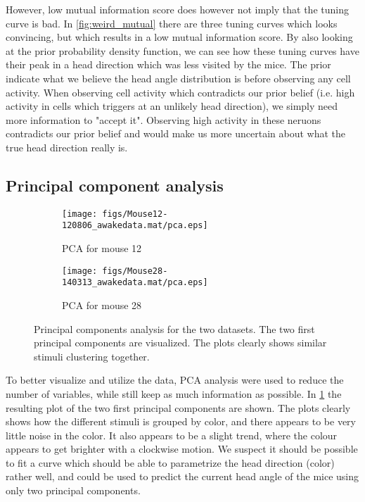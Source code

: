 However, low mutual information score does however not imply that the tuning curve is bad. In \cref{fig:weird_mutual} there are three tuning curves which looks convincing, but which results in a low mutual information score. By also looking at the prior probability density function, we can see how these tuning curves have their peak in a head direction which was less visited by the mice. The prior indicate what we believe the head angle distribution is before observing any cell activity. When observing cell activity which contradicts our prior belief (i.e. high activity in cells which triggers at an unlikely head direction), we simply need more information to "accept it". Observing high activity in these neruons contradicts our prior belief and would make us more uncertain about what the true head direction really is. 

\subsection{Principal component analysis}
\begin{figure}[H]
    \centering
    \begin{subfigure}[b]{0.4\textwidth}
        \texttt{[image: figs/Mouse12-120806\_awakedata.mat/pca.eps]}
        \caption{PCA for mouse 12}
    \end{subfigure}
    \begin{subfigure}[b]{0.4\textwidth}
        \texttt{[image: figs/Mouse28-140313\_awakedata.mat/pca.eps]}
        \caption{PCA for mouse 28}

    \end{subfigure}
    \caption{Principal components analysis for the two datasets. The two first principal components are visualized. The plots clearly shows similar stimuli clustering together.}
    \label{fig:pca}
\end{figure}
To better visualize and utilize the data, PCA analysis were used to reduce the number of variables, while still keep as much information as possible. In \cref{fig:pca} the resulting plot of the two first principal components are shown. The plots clearly shows how the different stimuli is grouped by color, and there appears to be very little noise in the color.
It also appears to be a slight trend, where the colour appears to get brighter with a clockwise motion. We suspect it should be possible to fit a curve which should be able to parametrize the head direction (color) rather well, and could be used to predict the current head angle of the mice using only two principal components. 
